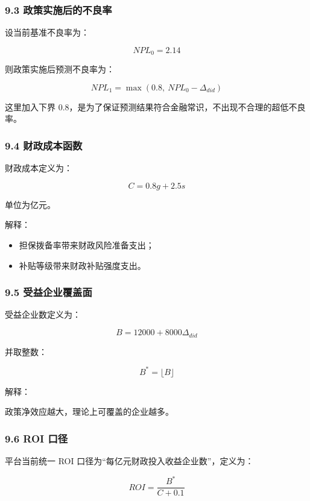 \documentclass[
]{article}
\providecommand{\tightlist}{%
  \setlength{\itemsep}{0pt}\setlength{\parskip}{0pt}}
\begin{document}
\subsubsection{9.3
政策实施后的不良率}\label{ux653fux7b56ux5b9eux65bdux540eux7684ux4e0dux826fux7387}

设当前基准不良率为：

\[
NPL_0 = 2.14
\]

则政策实施后预测不良率为：

\[
NPL_1 = \max(0.8,\ NPL_0 - \Delta_{did})
\]

这里加入下界
0.8，是为了保证预测结果符合金融常识，不出现不合理的超低不良率。

\subsubsection{9.4
财政成本函数}\label{ux8d22ux653fux6210ux672cux51fdux6570}

财政成本定义为：

\[
C = 0.8g + 2.5s
\]

单位为亿元。

解释：

\begin{itemize}
\tightlist
\item
  担保拨备率带来财政风险准备支出；
\item
  补贴等级带来财政补贴强度支出。
\end{itemize}

\subsubsection{9.5
受益企业覆盖面}\label{ux53d7ux76caux4f01ux4e1aux8986ux76d6ux9762}

受益企业数定义为：

\[
B = 12000 + 8000\Delta_{did}
\]

并取整数：

\[
B^{*} = \lfloor B \rfloor
\]

解释：

政策净效应越大，理论上可覆盖的企业越多。

\subsubsection{9.6 ROI 口径}\label{roi-ux53e3ux5f84}

平台当前统一 ROI 口径为``每亿元财政投入收益企业数''，定义为：

\[
ROI = \frac{B^{*}}{C + 0.1}
\]
\end{document}
